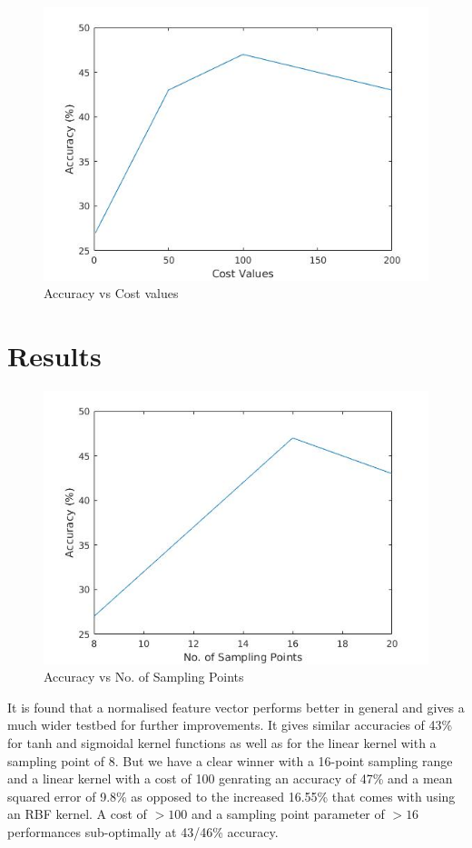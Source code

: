 \documentclass[preprint,12pt]{elsarticle}
\begin{document}
\begin{figure}[h]
\centering\includegraphics[width=0.85\linewidth]{cost}
\caption{Accuracy vs Cost values}
\end{figure}


\section{Results}
\label{S:2}

\begin{figure}[h]
\centering\includegraphics[width=0.85\linewidth]{samplepoints}
\caption{Accuracy vs No. of Sampling Points}
\end{figure}
It is found that a normalised feature vector performs better in general and gives a much wider testbed for further improvements. It gives similar accuracies of 43\% for tanh and sigmoidal kernel functions as well as for the linear kernel with a sampling point of 8. But we have a clear winner with a 16-point sampling range and a linear kernel with a cost of 100 genrating an accuracy of 47\% and a mean squared error of 9.8\% as opposed to the increased 16.55\% that comes with using an RBF kernel. A cost of $>100$ and a sampling point parameter of $>16$ performances sub-optimally at 43/46\% accuracy.\\
\end{document}
